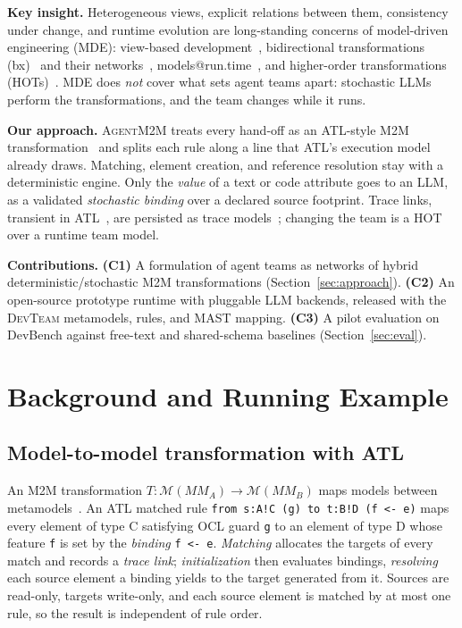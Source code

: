 \documentclass[10pt,conference]{IEEEtran}
\theoremstyle{definition}
\newcommand{\tool}{\textsc{AgentM2M}}
\newcommand{\devteam}{\textsc{DevTeam}}
\newcommand{\MM}{\mathit{MM}}
\newcommand{\Mods}[1]{\mathcal{M}(#1)}
\newcommand{\cls}[1]{\textsf{#1}}
\newcommand{\code}[1]{\texttt{#1}}
\begin{document}
\smallskip\noindent\textbf{Key insight.} Heterogeneous views, explicit
relations between them, consistency under change, and runtime evolution are
long-standing concerns of model-driven engineering (MDE): view-based
development~\cite{klare2021vitruvius,bruneliere2019views}, bidirectional
transformations (bx)~\cite{czarnecki2009bx,stevens2010qvt} and their
networks~\cite{stevens2020networks,klare2023termination},
models@run.time~\cite{blair2009runtime}, and higher-order transformations
(HOTs)~\cite{tisi2009hot}. MDE does \emph{not} cover what sets agent teams
apart: stochastic LLMs perform the transformations, and the team changes
while it runs.

\smallskip\noindent\textbf{Our approach.} \tool{} treats every hand-off as
an ATL-style M2M transformation~\cite{jouault2008atl} and splits each rule
along a line that ATL's execution model already draws. Matching, element
creation, and reference resolution stay with a deterministic engine. Only
the \emph{value} of a text or code attribute goes to an LLM, as a validated
\emph{stochastic binding} over a declared source footprint. Trace links,
transient in ATL~\cite{jouault2005traceability}, are persisted as trace
models~\cite{vara2014metagem}; changing the team is a HOT over a runtime
team model.

\smallskip\noindent\textbf{Contributions.} \textbf{(C1)} A formulation of
agent teams as networks of hybrid deterministic/stochastic M2M
transformations (Section~\ref{sec:approach}). \textbf{(C2)} An open-source
prototype runtime with pluggable LLM backends, released with the
\devteam{} metamodels, rules, and MAST mapping. \textbf{(C3)} A pilot
evaluation on DevBench against free-text and shared-schema baselines
(Section~\ref{sec:eval}).

\section{Background and Running Example}\label{sec:background}

\subsection{Model-to-model transformation with ATL}

An M2M transformation $T:\Mods{\MM_A}\to\Mods{\MM_B}$ maps models between
metamodels~\cite{jouault2008atl}. An ATL matched rule
\code{from s:A!C (g) to t:B!D (f <- e)} maps every element of type \cls{C}
satisfying OCL guard \code{g} to an element of type \cls{D} whose feature
\code{f} is set by the \emph{binding} \code{f <- e}. \emph{Matching}
allocates the targets of every match and records a \emph{trace link};
\emph{initialization} then evaluates bindings, \emph{resolving} each source
element a binding yields to the target generated from it. Sources are
read-only, targets write-only, and each source element is matched by at
most one rule, so the result is independent of rule order.
\end{document}

